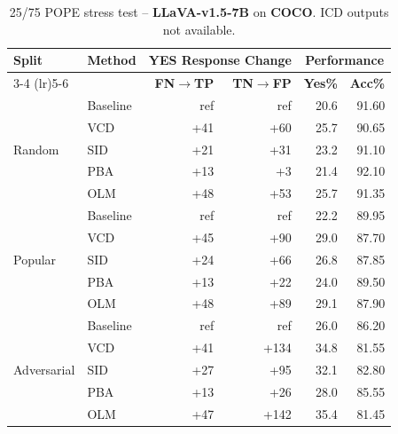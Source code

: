 \documentclass[11pt]{article}
\begin{document}
\begin{table}[ht]
\centering
\caption{25/75 POPE stress test -- \textbf{LLaVA-v1.5-7B} on \textbf{COCO}. ICD outputs not available.}
\label{tab:25_75_llava_coco}
\setlength{\tabcolsep}{6pt}
\renewcommand{\arraystretch}{1.1}
\begin{tabular}{l|l|rr|rr}
\toprule
\multirow{2}{*}{\textbf{Split}} &
\multirow{2}{*}{\textbf{Method}} &
\multicolumn{2}{c|}{\textbf{YES Response Change}} &
\multicolumn{2}{c}{\textbf{Performance}} \\
\cmidrule(lr){3-4} \cmidrule(lr){5-6}
& & \textbf{FN$\to$TP} & \textbf{TN$\to$FP} & \textbf{Yes\%} & \textbf{Acc\%} \\
\midrule

\multirow{5}{*}{Random}
& Baseline & ref  & ref  & 20.6 & 91.60 \\
& VCD      & +41  & +60  & 25.7 & 90.65 \\
& SID      & +21  & +31  & 23.2 & 91.10 \\
& PBA      & +13  & +3   & 21.4 & 92.10 \\
& OLM      & +48  & +53  & 25.7 & 91.35 \\
\midrule

\multirow{5}{*}{Popular}
& Baseline & ref  & ref  & 22.2 & 89.95 \\
& VCD      & +45  & +90  & 29.0 & 87.70 \\
& SID      & +24  & +66  & 26.8 & 87.85 \\
& PBA      & +13  & +22  & 24.0 & 89.50 \\
& OLM      & +48  & +89  & 29.1 & 87.90 \\
\midrule

\multirow{5}{*}{Adversarial}
& Baseline & ref  & ref  & 26.0 & 86.20 \\
& VCD      & +41  & +134 & 34.8 & 81.55 \\
& SID      & +27  & +95  & 32.1 & 82.80 \\
& PBA      & +13  & +26  & 28.0 & 85.55 \\
& OLM      & +47  & +142 & 35.4 & 81.45 \\
\bottomrule
\end{tabular}
\end{table}

\end{document}
